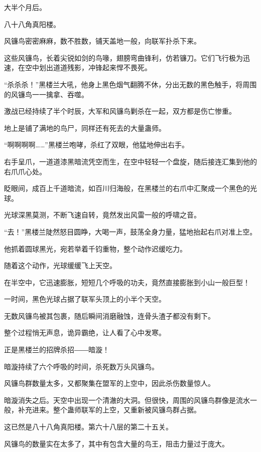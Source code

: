 
\begin{this_body}

大半个月后。

八十八角真阳楼。

风镰鸟密密麻麻，数不胜数，铺天盖地一般，向联军扑杀下来。

这些风镰鸟，长着尖锐如剑的鸟喙，翅膀弯曲锋利，仿若镰刀。它们飞行极为迅速，在空中划出道道残影，冲锋起来悍不畏死。

“杀杀杀！”黑楼兰大吼，他身上黑色烟气翻腾不休，分出无数的黑色触手，将周围的风镰鸟一一擒拿、吞噬。

激战已经持续了半个时辰，大军和风镰鸟剿杀在一起，双方都是伤亡惨重。

地上是铺了满地的鸟尸，同样还有死去的大量蛊师。

“啊啊啊啊……”黑楼兰咆哮，杀红了双眼，他猛地伸出右手。

右手呈爪，一道道漆黑暗流凭空而生，在空中轻轻一个盘旋，随后接连汇集到他的右爪爪心处。

眨眼间，成百上千道暗流，如百川归海般，在黑楼兰的右爪中汇聚成一个黑色的光球。

光球深黑莫测，不断飞速自转，竟然发出风雷一般的呼啸之音。

“去！”黑楼兰陡然怒目圆睁，大喝一声，鼓荡全身力量，猛地抬起右爪对准上空。

他抓着圆球黑光，宛若举着千钧重物，整个动作迟缓吃力。

随着这个动作，光球缓缓飞上天空。

在半空中，它迅速膨胀，短短几个呼吸的功夫，竟然直接膨胀到小山一般巨型！

一时间，黑色光球占据了联军头顶上的小半个天空。

无数风镰鸟被其包裹，随后瞬间消磨融蚀，连骨头渣子都没有剩下。

整个过程悄无声息，诡异霸绝，让人看了心中发寒。

正是黑楼兰的招牌杀招――暗漩！

暗漩持续了六个呼吸的时间，杀死数万头风镰鸟。

风镰鸟群数量太多，又都聚集在盟军的上空中，因此杀伤数量惊人。

暗漩消失之后。天空中出现一个清澈的大洞。但很快，周围的风镰鸟群像是流水一般，补充进来。整个蛊师联军的上空，又重新被风镰鸟群占据。

这已然是八十八角真阳楼。第六十八层的第二十五关。

风镰鸟的数量实在太多了，其中有包含大量的鸟王，阻击力量过于庞大。


\end{this_body}
